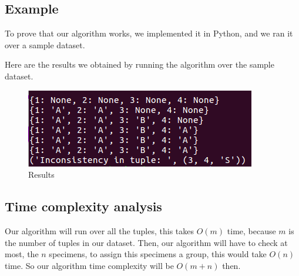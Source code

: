 \documentclass{article}
\begin{document}
\subsection*{Example}

To prove that our algorithm works, we implemented it in Python, and we ran it over a sample dataset.



Here are the results we obtained by running the algorithm over the sample dataset.

\begin{figure}[H]
\begin{center}
\includegraphics[scale=.8]{problem2}
\end{center}
\caption{Results}
\end{figure}

\subsection*{Time complexity analysis}

Our algorithm will run over all the tuples, this takes $O(m)$ time, because $m$ is the number of tuples in our dataset. Then, our algorithm will have to check at most, the $n$ specimens, to assign this specimens a group, this would take $O(n)$ time. So our algorithm time complexity will be $O(m+n)$ then.
\end{document}
